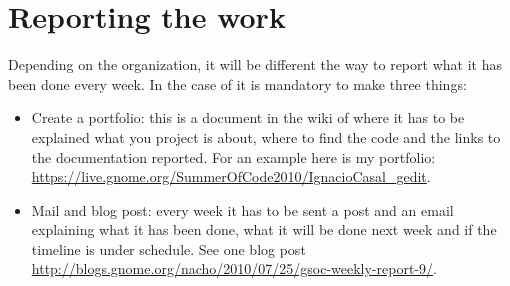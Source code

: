 \section{Reporting the work}\label{ReportingGSoC}

Depending on the organization, it will be different the way to report what it has been done every week. In the case of \GNOME it is mandatory to make three things:

\begin{itemize}
  \item Create a portfolio: this is a document in the wiki of \GNOME where it has to be explained what you project is about, where to find the code and the links to the documentation reported. For an example here is my portfolio: \url{https://live.gnome.org/SummerOfCode2010/IgnacioCasal_gedit}.
  \item Mail and blog post: every week it has to be sent a post and an email explaining what it has been done, what it will be done next week and if the timeline is under schedule. See one blog post \url{http://blogs.gnome.org/nacho/2010/07/25/gsoc-weekly-report-9/}.
\end{itemize}
